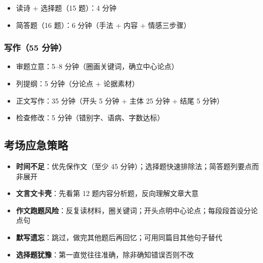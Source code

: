\begin{itemize}
  \item 读诗 + 选择题（15 题）：4 分钟
  \item 简答题（16 题）：6 分钟（手法 + 内容 + 情感三步骤）
\end{itemize}

\subsubsection{写作（55 分钟）}

\begin{itemize}
  \item 审题立意：5--8 分钟（圈画关键词，确立中心论点）
  \item 列提纲：5 分钟（分论点 + 论据素材）
  \item 正文写作：35 分钟（开头 5 分钟 + 主体 25 分钟 + 结尾 5 分钟）
  \item 检查修改：5 分钟（错别字、语病、字数达标）
\end{itemize}

\subsection{考场应急策略}

\begin{itemize}
  \item \textbf{时间不足}：优先保作文（至少 45 分钟）；选择题快速排除法；简答题列要点而非展开
  \item \textbf{文言文卡壳}：先看第 12 题内容分析题，反向理解文章大意
  \item \textbf{作文跑题风险}：反复读材料，圈关键词；开头点明中心论点；每段段首设分论点句
  \item \textbf{默写遗忘}：跳过，做完其他题后再回忆；可用同篇目其他句子替代
  \item \textbf{选择题犹豫}：第一直觉往往准确，除非确知错误否则不改
\end{itemize}
